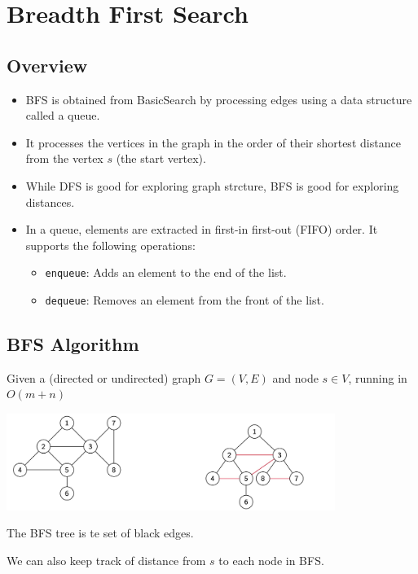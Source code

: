 \documentclass[12pt]{article}
\date{March 30, 2021}
\begin{document}
\maketitle

\section{Breadth First Search}
\subsection{Overview}
\begin{itemize}
    \item BFS is obtained from BasicSearch by processing edges using a data structure called a queue.
    \item It processes the vertices in the graph in the order of their shortest distance from the vertex $s$ (the start vertex).
    \item While DFS is good for exploring graph strcture, BFS is good for exploring distances.
    \item In a queue, elements are extracted in first-in first-out (FIFO) order. It supports the following operations:
    \begin{itemize}
        \item \texttt{enqueue}: Adds an element to the end of the list.
        \item \texttt{dequeue}: Removes an element from the front of the list.
    \end{itemize}
\end{itemize}

\subsection{BFS Algorithm}
\begin{itemize}
    \item Given a (directed or undirected) graph $G = (V, E)$ and node $s \in V$, running in $O(m + n)$
    \item[] 
    \begin{center}
        \item[] \includegraphics[width=0.8\textwidth]{images/bfs-undirected-example.jpg}
    \end{center}
    \item The BFS tree is te set of black edges.
    \item We can also keep track of distance from $s$ to each node in BFS.
    \item[] 
\end{itemize}
\end{document}
